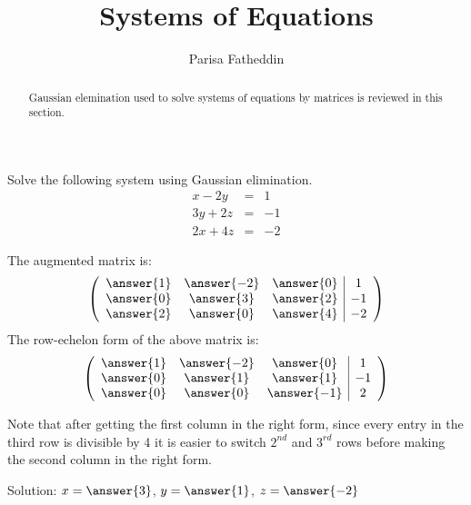\documentclass{ximera}
\author{Parisa Fatheddin}
\title{Systems of Equations}
\begin{document}
\begin{abstract}
Gaussian elemination used to solve systems of equations by matrices is reviewed in this section. 
\end{abstract}
\maketitle
\begin{center}
\end{center}

\begin{exercise}

Solve the following system using Gaussian elimination.
\begin{eqnarray*}
x-2y&=& 1\\
3y+2z &=& -1\\
2x +4z &=& -2
\end{eqnarray*}
\begin{prompt}
The augmented matrix is:
\[
\left(\begin{array}{ccc|c}
  \answer{1} &  \answer{-2} & \answer{0} &1 \\
  \answer{0} & \answer{3} & \answer{2} & -1 \\
  \answer{2} &  \answer{0} & \answer{4} & -2
\end{array}\right)
\]
The row-echelon form of the above matrix is:
\[
\left(\begin{array}{ccc|c}
  \answer{1} &  \answer{-2} & \answer{0} &1 \\
  \answer{0} & \answer{1} & \answer{1} & -1 \\
  \answer{0} &  \answer{0} & \answer{-1} & 2
\end{array}\right)
\]
\begin{hint}
Note that after getting the first column in the right form, since every entry in the third row is divisible by 4 it is easier to switch $2^{nd}$ and $3^{rd}$ rows before making the second column in the right form.
\end{hint}
\end{prompt}
Solution: \hspace{.6cm} $x = \answer{3}$, \hspace{.6cm} $y = \answer{1}$, \hspace{.6cm} $z= \answer{-2}$

\end{exercise}
\end{document}
